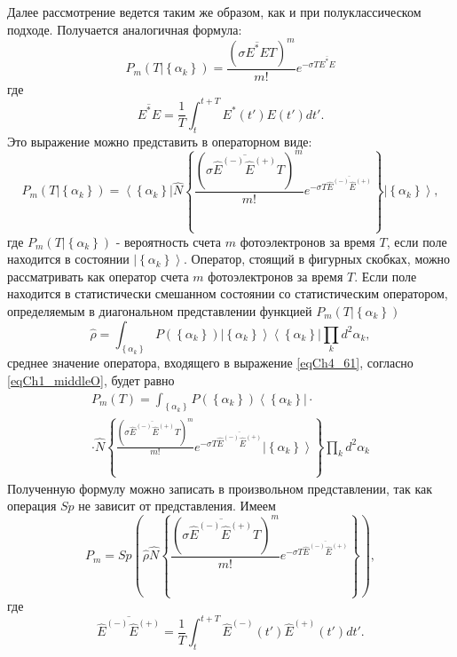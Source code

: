 Далее рассмотрение ведется таким же образом, как и при
полуклассическом подходе. Получается аналогичная формула: 
\begin{equation}
P_m\left(\left.T\right|\left\{\alpha_k\right\}\right) = 
\frac{\left(\sigma \overline{E^\ast E} T\right)^m}{m!}
e^{- \sigma T \overline{E^\ast E}}
\label{eqCh4_60}
\end{equation}
где
\[
\overline{E^\ast E} = \frac{1}{T} \int_t^{t + T}E^\ast\left(t'\right)
E\left(t'\right)dt'.
\]
Это выражение можно представить в операторном виде:
\begin{equation}
P_m\left(\left.T\right|\left\{\alpha_k\right\}\right) = 
\left<\left\{\alpha_k\right\}\right|
\hat{N}
\left\{
\frac{\left(\sigma \overline{\hat{E}^{(-)} \hat{E}^{(+)}} T\right)^m}{m!}
e^{- \sigma T \overline{\hat{E}^{(-)} \hat{E}^{(+)}}}
\right\}
\left|\left\{\alpha_k\right\}\right>,
\label{eqCh4_61}
\end{equation}
где $P_m\left(\left.T\right|\left\{\alpha_k\right\}\right)$ -
вероятность счета $m$ фотоэлектронов за время $T$,  если поле
находится в состоянии $\left|\left\{\alpha_k\right\}\right>$.
Оператор, стоящий в фигурных скобках, можно 
рассматривать как оператор счета $m$ фотоэлектронов за время $T$.  Если
поле находится в статистически смешанном состоянии со статистическим
оператором, определяемым в диагональном представлении функцией 
$P_m\left(\left.T\right|\left\{\alpha_k\right\}\right)$
\[
\hat{\rho} = \int_{\left\{\alpha_k\right\}}
P\left(\left\{\alpha_k\right\}\right)
\left|\left\{\alpha_k\right\}\right>
\left<\left\{\alpha_k\right\}\right|
\prod_k d^2\alpha_k,
\]
среднее значение оператора, входящего в выражение \eqref{eqCh4_61},
согласно \eqref{eqCh1_middleO}, будет равно 
\begin{eqnarray}
P_m\left(T\right) =
\int_{\left\{\alpha_k\right\}}
P\left(\left\{\alpha_k\right\}\right)
\left<\left\{\alpha_k\right\}\right|
\cdot
\nonumber \\
\cdot 
\hat{N}
\left\{
\frac{\left(\sigma \overline{\hat{E}^{(-)} \hat{E}^{(+)}} T\right)^m}{m!}
e^{- \sigma T \overline{\hat{E}^{(-)} \hat{E}^{(+)}}}
\left|\left\{\alpha_k\right\}\right>
\right\}
\prod_k d^2\alpha_k
\label{eqCh4_62}
\end{eqnarray}
Полученную формулу можно записать в произвольном представлении, так
как операция $Sp$ не зависит от представления. Имеем 
\begin{equation}
P_m = Sp\left(
\hat{\rho}
\hat{N}
\left\{
\frac{\left(\sigma \overline{\hat{E}^{(-)} \hat{E}^{(+)}} T\right)^m}{m!}
e^{- \sigma T \overline{\hat{E}^{(-)} \hat{E}^{(+)}}}
\right\}
\right),
\label{eqCh4_63}
\end{equation}
где
\[
\overline{\hat{E}^{(-)} \hat{E}^{(+)}} = \frac{1}{T} \int_t^{t + T}\hat{E}^{(-)}\left(t'\right)
\hat{E}^{(+)}\left(t'\right)dt'.
\]

